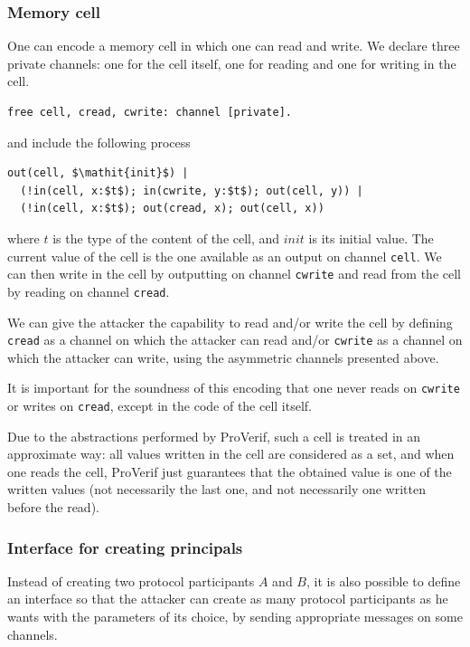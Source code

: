 \documentclass{book}
\begin{document}
\subsubsection{Memory cell}

One can encode a memory cell in which one can read
and write. We declare three private channels: one for the cell itself,
one for reading and one for writing in the cell.
\begin{lstlisting}[numbers=none]
  free cell, cread, cwrite: channel [private].
\end{lstlisting}
and include the following process
\begin{lstlisting}[numbers=none]
  out(cell, $\mathit{init}$) |
  (!in(cell, x:$t$); in(cwrite, y:$t$); out(cell, y)) |
  (!in(cell, x:$t$); out(cread, x); out(cell, x))
\end{lstlisting}
where $t$ is the type of the content of the cell, and $\mathit{init}$
is its initial value. The current value of the cell is the one
available as an output on channel \lstinline!cell!.
We can then write in the cell by outputting on channel \lstinline!cwrite!
and read from the cell by reading on channel \lstinline!cread!.

We can give the attacker the capability to read and/or write the cell
by defining \lstinline!cread! as a channel on which the attacker can read
and/or \lstinline!cwrite! as a channel on which the attacker can write,
using the asymmetric channels presented above.

It is important for the soundness of this encoding that one
never reads on \lstinline!cwrite! or writes on \lstinline!cread!,
except in the code of the cell itself.

Due to the abstractions performed by ProVerif, such a cell is treated
in an approximate way: all values written in the cell are considered as
a set, and when one reads the cell, ProVerif just guarantees that the
obtained value is one of the written values (not necessarily the last
one, and not necessarily one written before the read).

\subsubsection{Interface for creating principals}

Instead of creating two protocol participants $A$ and $B$, it is
also possible to define an interface so that the attacker can
create as many protocol participants as he wants with the parameters
of its choice, by sending appropriate messages on some channels.
\end{document}

